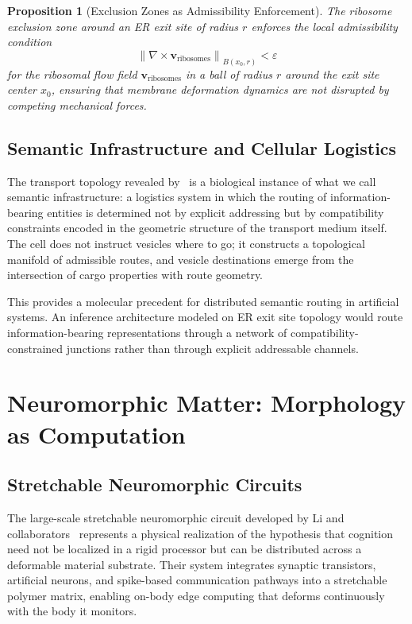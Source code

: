 \documentclass[11pt, oneside]{article}
\numberwithin{equation}{section}
\theoremstyle{rsvpstyle}
\newtheorem{proposition}[theorem]{Proposition}
\theoremstyle{remark}
\newcommand{\vfield}{\mathbf{v}}
\newcommand{\norm}[1]{\left\lVert #1 \right\rVert}
\newcommand{\grad}{\nabla}
\begin{document}
\begin{proposition}[Exclusion Zones as Admissibility Enforcement]
The ribosome exclusion zone around an ER exit site of radius $r$ enforces the local
admissibility condition
\begin{equation}
  \norm{\grad \times \vfield_\text{ribosomes}}_{B(x_0, r)} < \varepsilon
\end{equation}
for the ribosomal flow field $\vfield_\text{ribosomes}$ in a ball of radius $r$
around the exit site center $x_0$, ensuring that membrane deformation dynamics are
not disrupted by competing mechanical forces.
\end{proposition}

\subsection{Semantic Infrastructure and Cellular Logistics}

The transport topology revealed by~\cite{Downes2026ERES} is a biological instance of
what we call semantic infrastructure: a logistics system in which the routing of
information-bearing entities is determined not by explicit addressing but by
compatibility constraints encoded in the geometric structure of the transport medium
itself. The cell does not instruct vesicles where to go; it constructs a topological
manifold of admissible routes, and vesicle destinations emerge from the intersection
of cargo properties with route geometry.

This provides a molecular precedent for distributed semantic routing in artificial
systems. An inference architecture modeled on ER exit site topology would route
information-bearing representations through a network of compatibility-constrained
junctions rather than through explicit addressable channels.

\section{Neuromorphic Matter: Morphology as Computation}

\subsection{Stretchable Neuromorphic Circuits}

The large-scale stretchable neuromorphic circuit developed by Li and
collaborators~\cite{Li2026Stretchable} represents a physical realization of the
hypothesis that cognition need not be localized in a rigid processor but can be
distributed across a deformable material substrate. Their system integrates synaptic
transistors, artificial neurons, and spike-based communication pathways into a
stretchable polymer matrix, enabling on-body edge computing that deforms continuously
with the body it monitors.
\end{document}
